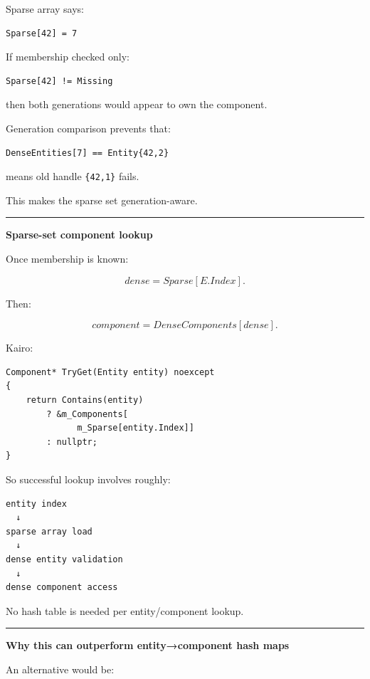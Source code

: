 Sparse array says:

\begin{verbatim}
Sparse[42] = 7
\end{verbatim}

If membership checked only:

\begin{verbatim}
Sparse[42] != Missing
\end{verbatim}

then both generations would appear to own the component.

Generation comparison prevents that:

\begin{verbatim}
DenseEntities[7] == Entity{42,2}
\end{verbatim}

means old handle \texttt{\{42,1\}} fails.

This makes the sparse set generation-aware.

\begin{center}\rule{0.5\linewidth}{0.5pt}\end{center}

\textbf{Sparse-set component lookup}

Once membership is known:

\[
dense=Sparse[E.Index].
\]

Then:

\[
component=DenseComponents[dense].
\]

Kairo:

\begin{verbatim}
Component* TryGet(Entity entity) noexcept
{
    return Contains(entity)
        ? &m_Components[
              m_Sparse[entity.Index]]
        : nullptr;
}
\end{verbatim}

So successful lookup involves roughly:

\begin{verbatim}
entity index
  ↓
sparse array load
  ↓
dense entity validation
  ↓
dense component access
\end{verbatim}

No hash table is needed per entity/component lookup.

\begin{center}\rule{0.5\linewidth}{0.5pt}\end{center}

\textbf{Why this can outperform entity→component hash maps}

An alternative would be:

